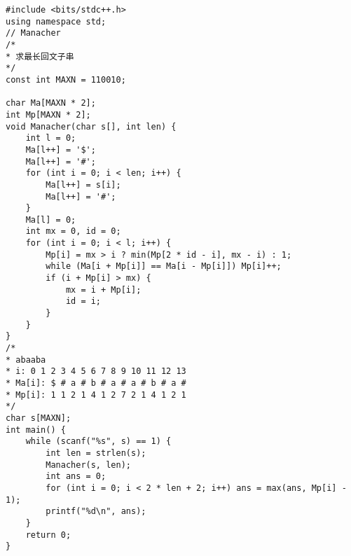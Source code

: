 \begin{lstlisting}
#include <bits/stdc++.h>
using namespace std;
// Manacher
/*
* 求最长回文子串
*/
const int MAXN = 110010;

char Ma[MAXN * 2];
int Mp[MAXN * 2];
void Manacher(char s[], int len) {
	int l = 0;
	Ma[l++] = '$';
	Ma[l++] = '#';
	for (int i = 0; i < len; i++) {
		Ma[l++] = s[i];
		Ma[l++] = '#';
	}
	Ma[l] = 0;
	int mx = 0, id = 0;
	for (int i = 0; i < l; i++) {
		Mp[i] = mx > i ? min(Mp[2 * id - i], mx - i) : 1;
		while (Ma[i + Mp[i]] == Ma[i - Mp[i]]) Mp[i]++;
		if (i + Mp[i] > mx) {
			mx = i + Mp[i];
			id = i;
		}
	}
}
/*
* abaaba
* i: 0 1 2 3 4 5 6 7 8 9 10 11 12 13
* Ma[i]: $ # a # b # a # a # b # a #
* Mp[i]: 1 1 2 1 4 1 2 7 2 1 4 1 2 1
*/
char s[MAXN];
int main() {
	while (scanf("%s", s) == 1) {
		int len = strlen(s);
		Manacher(s, len);
		int ans = 0;
		for (int i = 0; i < 2 * len + 2; i++) ans = max(ans, Mp[i] - 1);
		printf("%d\n", ans);
	}
	return 0;
}
\end{lstlisting}